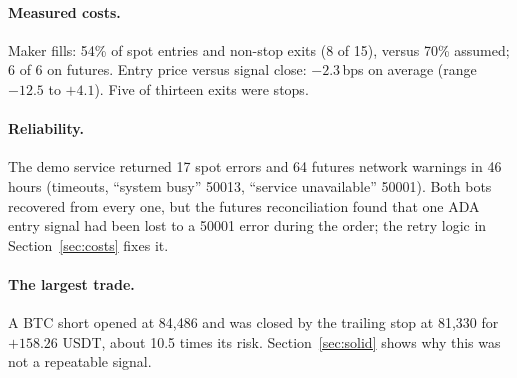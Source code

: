 \documentclass[11pt,a4paper]{article}
\begin{document}
\paragraph{Measured costs.} Maker fills: 54\% of spot entries and non-stop exits (8 of 15),
versus 70\% assumed; 6 of 6 on futures. Entry price versus signal close: $-2.3$\,bps on average
(range $-12.5$ to $+4.1$). Five of thirteen exits were stops.

\paragraph{Reliability.} The demo service returned 17 spot errors and 64 futures network
warnings in 46 hours (timeouts, ``system busy'' 50013, ``service unavailable'' 50001). Both bots
recovered from every one, but the futures reconciliation found that one ADA entry signal had been
lost to a 50001 error during the order; the retry logic in Section~\ref{sec:costs} fixes it.

\paragraph{The largest trade.} A BTC short opened at 84{,}486 and was closed by the trailing stop
at 81{,}330 for $+158.26$ USDT, about 10.5 times its risk. Section~\ref{sec:solid} shows why this was not a
repeatable signal.

\end{document}
